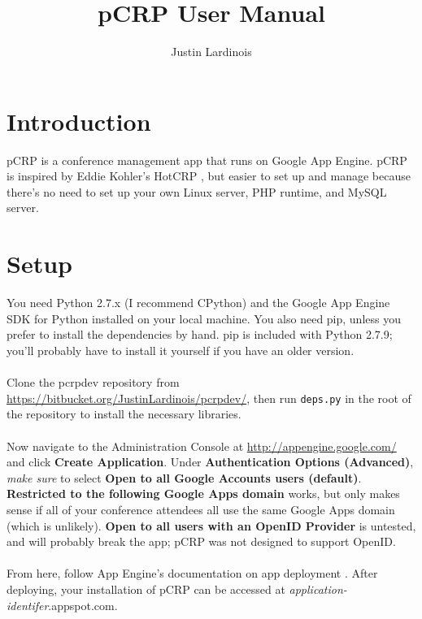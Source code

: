 \documentclass[12pt]{article}
\title{pCRP User Manual}
\author{Justin Lardinois}
\date{}
\begin{document}
\maketitle

\section{Introduction}
	pCRP is a conference management app that runs on Google App Engine.
	pCRP is inspired by Eddie Kohler's HotCRP \cite{kohler}, but easier
	to set up and manage because there's no need to set up your own Linux
	server, PHP runtime, and MySQL server.
\section{Setup}
	You need Python 2.7.x (I recommend CPython) and the Google App Engine
	SDK for Python \cite{gaesdk} installed on your local machine. You also
	need pip, unless you prefer to install the dependencies by hand. pip
	is included with Python 2.7.9; you'll probably have to install it
	yourself if you have an older version.
	\\\\
	Clone the pcrpdev repository from
	\url{https://bitbucket.org/JustinLardinois/pcrpdev/}, then run
	\texttt{deps.py} in the root of the repository to install the
	necessary libraries.
	\\\\
	Now navigate to the Administration Console at
	\url{http://appengine.google.com/} and click \textbf{Create Application}.
	Under \textbf{Authentication Options (Advanced)}, \textit{make sure}
	to select \textbf{Open to all Google Accounts users (default)}.
	\textbf{Restricted to the following Google Apps domain} works,
	but only makes sense if all of your conference attendees all use
	the same Google Apps domain (which is unlikely).
	\textbf{Open to all users with an OpenID Provider} is untested,
	and will probably break the app; pCRP was not designed to
	support OpenID.
	\\\\
	From here, follow App Engine's documentation on app deployment
	\cite{deploy}. After deploying, your installation of pCRP can
	be accessed at \textit{application-identifer}.appspot.com.



\end{document}
